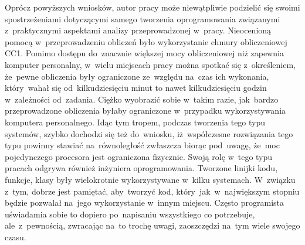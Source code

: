 Oprócz powyższych wniosków, autor pracy może niewątpliwie podzielić się swoimi spostrzeżeniami dotyczącymi samego tworzenia oprogramowania związanymi z~praktycznymi aspektami analizy przeprowadzonej w~pracy. Nieocenioną pomocą w~przeprowadzeniu obliczeń było wykorzystanie chmury obliczeniowej CC1. Pomimo dostępu do~znacznie większej mocy obliczeniowej niż zapewnia komputer personalny, w~wielu miejscach pracy można spotkać się z~określeniem, że~pewne obliczenia były ograniczone ze~względu na~czas ich wykonania, który~wahał się od~kilkudziesięciu minut to nawet kilkudziesięciu godzin w~zależności od~zadania. Ciężko wyobrazić sobie w~takim razie, jak~bardzo przeprowadzone obliczenia byłaby ograniczone w~przypadku wykorzystywania komputera personalnego. Idąc tym tropem, podczas tworzenia tego typu systemów, szybko dochodzi się też do~wniosku, iż~współczesne rozwiązania tego typu powinny stawiać na~równoległość zwłaszcza biorąc pod~uwagę, że~moc pojedynczego procesora jest ograniczona fizycznie. Swoją rolę w~tego typu pracach odgrywa również inżyniera oprogramowania. Tworzone linijki kodu, funkcje, klasy były wielokrotnie wykorzystywane w~kilku systemach. W~związku z~tym, dobrze jest pamiętać, aby~tworzyć kod, który~jak~w~największym stopniu będzie pozwalał na~jego wykorzystanie w~innym miejscu. Często programista uświadamia sobie to dopiero po~napisaniu wszystkiego co potrzebuje, ale~z~pewnością, zwracając na~to trochę uwagi, zaoszczędzi na~tym wiele swojego czasu.
